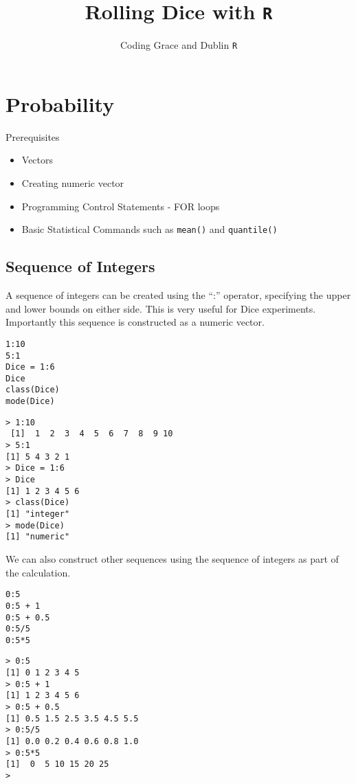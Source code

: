 \documentclass[11pt]{article} %
\title{Rolling Dice with \texttt{R}}
\author{Coding Grace  and Dublin \texttt{R}}
\begin{document}
\maketitle

\section{Probability}
Prerequisites
\begin{itemize}
\item Vectors
\item Creating numeric vector
\item Programming Control Statements - FOR loops
\item Basic Statistical Commands such as \texttt{mean()} and \texttt{quantile()}
\end{itemize}
\subsection{Sequence of Integers}
A sequence of integers can be created using the “:” operator, specifying the upper and lower bounds on either side. This is very useful for Dice experiments. Importantly this sequence is constructed as a numeric vector.
\begin{framed}
\begin{verbatim}
1:10
5:1
Dice = 1:6
Dice
class(Dice)
mode(Dice)
\end{verbatim}
\end{framed}

\begin{verbatim}
> 1:10
 [1]  1  2  3  4  5  6  7  8  9 10
> 5:1
[1] 5 4 3 2 1
> Dice = 1:6
> Dice
[1] 1 2 3 4 5 6
> class(Dice)
[1] "integer"
> mode(Dice)
[1] "numeric"
\end{verbatim}

We can also construct other sequences using the sequence of integers as part of the calculation.
\begin{framed}
\begin{verbatim}
0:5
0:5 + 1
0:5 + 0.5
0:5/5
0:5*5
\end{verbatim}
\end{framed}
\begin{verbatim}
> 0:5
[1] 0 1 2 3 4 5
> 0:5 + 1
[1] 1 2 3 4 5 6
> 0:5 + 0.5
[1] 0.5 1.5 2.5 3.5 4.5 5.5
> 0:5/5
[1] 0.0 0.2 0.4 0.6 0.8 1.0
> 0:5*5
[1]  0  5 10 15 20 25
> 
\end{verbatim}
\end{document}
